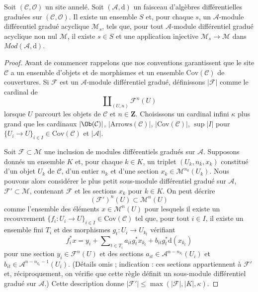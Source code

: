 \begin{lemma}
\label{lemma-small-acyclics}
Soit $(\mathcal{C}, \mathcal{O})$ un site annelé.
Soit $(\mathcal{A}, \text{d})$ un faisceau d'algèbres différentielles graduées sur $(\mathcal{C}, \mathcal{O})$.
Il existe un ensemble $S$ et, pour chaque $s$, un $\mathcal{A}$-module différentiel gradué acyclique $\mathcal{M}_s$, tels que, pour tout $\mathcal{A}$-module différentiel gradué acyclique non nul $\mathcal{M}$, il existe $s \in S$ et une application injective $\mathcal{M}_s \to \mathcal{M}$ dans $\textit{Mod}(\mathcal{A}, \text{d})$.
\end{lemma}

\begin{proof}
Avant de commencer rappelons que nos conventions garantissent que le site $\mathcal{C}$ a un ensemble d'objets et de morphismes et un ensemble $\text{Cov}(\mathcal{C})$ de couvertures.
Si $\mathcal{F}$ est un $\mathcal{A}$-module différentiel gradué, définissons $|\mathcal{F}|$ comme le cardinal de
$$
\coprod\nolimits_{(U, n)} \mathcal{F}^n(U)
$$
lorsque $U$ parcourt les objets de $\mathcal{C}$ et $n \in \mathbf{Z}$.
Choisissons un cardinal infini $\kappa$ plus grand que les cardinaux $|\Ob(\mathcal{C})|$, $|\text{Arrows}(\mathcal{C})|$, $|\text{Cov}(\mathcal{C})|$, $\sup |I|$ pour $\{U_i \to U\}_{i \in I} \in \text{Cov}(\mathcal{C})$ et $|\mathcal{A}|$.

\medskip\noindent
Soit $\mathcal{F} \subset \mathcal{M}$ une inclusion de modules différentiels gradués sur $\mathcal{A}$.
Supposons donnés un ensemble $K$ et, pour chaque $k \in K$, un triplet $(U_k, n_k, x_k)$ constitué d'un objet $U_k$ de $\mathcal{C}$, d'un entier $n_k$ et d'une section $x_k \in \mathcal{M}^{n_k}(U_k)$.
Nous pouvons alors considérer le plus petit sous-module différentiel gradué sur $\mathcal{A}$, $\mathcal{F}' \subset \mathcal{M}$, contenant $\mathcal{F}$ et les sections $x_k$ pour $k \in K$.
On peut décrire
$$
(\mathcal{F}')^n(U) \subset \mathcal{M}^n(U)
$$
comme l'ensemble des éléments $x \in \mathcal{M}^n(U)$ pour lesquels il existe un recouvrement $\{f_i : U_i \to U\}_{i \in I} \in \text{Cov}(\mathcal{C})$ tel que, pour tout $i \in I$, il existe un ensemble fini $T_i$ et des morphismes $g_t : U_i \to U_{k_t}$ vérifiant
$$
f_i^*x = y_i +
\sum\nolimits_{t \in T_i} a_{it}g_t^*x_{k_t} + b_{it}g_t^*\text{d}(x_{k_t})
$$
pour une section $y_i \in \mathcal{F}^n(U)$ et des sections $a_{it} \in \mathcal{A}^{n - n_{k_t}}(U_i)$ et $b_{it} \in \mathcal{A}^{n - n_{k_t} - 1}(U_i)$. (Détails omis ; indication : ces sections appartiennent à $\mathcal{F}'$ et, réciproquement, on vérifie que cette règle définit un sous-module différentiel gradué sur $\mathcal{A}$.) Cette description donne $|\mathcal{F}'| \leq \max(|\mathcal{F}|, |K|, \kappa)$.


\end{proof}
